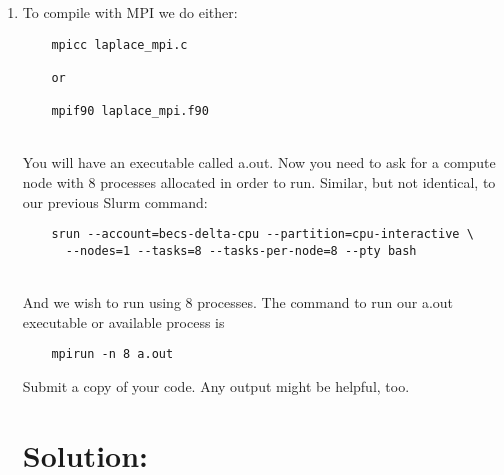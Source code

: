 \documentclass[11pt]{article}
\begin{document}
\begin{enumerate}
  \item {To compile with MPI we do either:

  \begin{verbatim}
    mpicc laplace_mpi.c
    
    or
    
    mpif90 laplace_mpi.f90
  \end{verbatim}
  \\You will have an executable called a.out. Now you need to ask for a compute node with 8 processes allocated in order to run. Similar, but not identical, to our previous Slurm command:
  \begin{verbatim}
    srun --account=becs-delta-cpu --partition=cpu-interactive \
      --nodes=1 --tasks=8 --tasks-per-node=8 --pty bash
  \end{verbatim}
  \\And we wish to run using 8 processes. The command to run our a.out executable or available process is
  \begin{verbatim}
    mpirun -n 8 a.out
  \end{verbatim}
  Submit a copy of your code. Any output might be helpful, too.
  }

\section{Solution:}









\end{enumerate}
\end{document}
